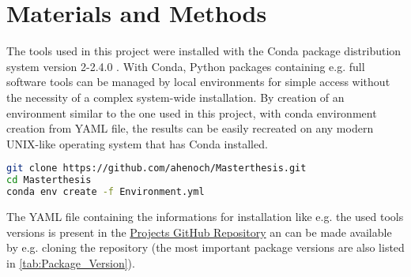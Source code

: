 \chapter{Materials and Methods} \label{chap:Materials_and_Methods}

The tools used in this project were installed with the Conda package distribution system version 2-2.4.0 \autocite{anaconda_software_distribution_anaconda_2020}. With Conda, Python packages containing e.g. full software tools can be managed by local environments for simple access without the necessity of a complex system-wide installation. By creation of an environment similar to the one used in this project, with conda environment creation from YAML file, the results can be easily recreated on any modern UNIX-like operating system that has Conda installed. 

\begin{lstlisting}[language=sh]
git clone https://github.com/ahenoch/Masterthesis.git
cd Masterthesis
conda env create -f Environment.yml
\end{lstlisting}  

The YAML file containing the informations for installation like e.g. the used tools versions is present in the \href{https://github.com/ahenoch/Masterthesis.git}{Projects GitHub Repository} an can be made available by e.g. cloning the repository (the most important package versions are also listed in \autoref{tab:Package_Version}).

\begin{table}[!hbt]
    \centering
    \caption[Package Version]{\textbf{Package Version.}.}
    \label{tab:Package_Version}
\end{table}

